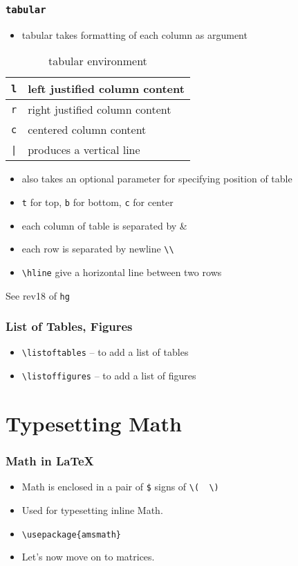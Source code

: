 \documentclass{beamer}
\newcommand{\typ}[1]{\lstinline{#1}}
\begin{document}
\begin{frame}[fragile]
  \frametitle{\lstinline+tabular+}
  \begin{itemize}
  \item tabular takes formatting of each column as argument
  \end{itemize}

  \begin{table}
    \caption{tabular environment}
    
    \begin{tabular}{|l|l|}
      \lstinline+l+ & left justified column content\\\hline
      \lstinline+r+ & right justified column content\\\hline
      \lstinline+c+ & centered column content\\\hline
      \lstinline+|+ & produces a vertical line\\
    \end{tabular}
  \end{table}
  \begin{itemize}
  \item also takes an optional parameter for specifying position of
    table 
  \item \lstinline+t+ for top, \lstinline+b+ for bottom, \lstinline+c+
    for center 
  \item each column of table is separated by \&
  \item each row is separated by newline \lstinline{\\}
  \item \lstinline+\hline+ give a horizontal line between two rows
  \end{itemize}
  \tiny See rev18 of \typ{hg}
\end{frame}

\begin{frame}[fragile]
  \frametitle{List of Tables, Figures}
  \begin{itemize}
  \item \lstinline+\listoftables+ -- to add a list of tables
  \item \lstinline+\listoffigures+ -- to add a list of figures
  \end{itemize}
\end{frame}


\section{Typesetting Math}
\begin{frame}[fragile]
  \frametitle{Math in \LaTeX}
  \begin{itemize}
  \item Math is enclosed in a pair of \lstinline{$} signs of %
    \lstinline+\(  \)+ 
  \item Used for typesetting inline Math. 
  \item \lstinline+\usepackage{amsmath}+
  \item Let's now move on to matrices. 
  \end{itemize}
\end{frame}
\end{document}
